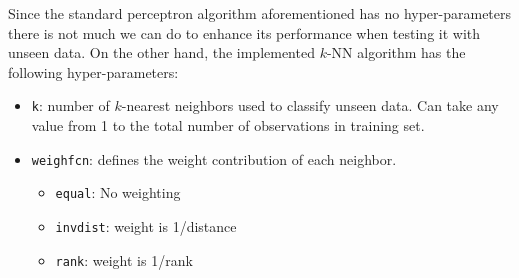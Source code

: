 Since the standard perceptron algorithm aforementioned has no hyper-parameters there is not much we can do to enhance its performance when testing it with unseen data. On the other hand, the implemented $k$-NN algorithm has the following hyper-parameters:
\begin{itemize}
	\item \texttt{k}: number of $k$-nearest neighbors used to classify unseen data. Can take any value from 1 to the total number of observations in training set.
	\item \texttt{weighfcn}: defines the weight contribution of each neighbor.
	\begin{itemize}
		\item \texttt{equal}: No weighting
		\item \texttt{invdist}: weight is 1/distance
		\item \texttt{rank}: weight is 1/rank
	\end{itemize}
\end{itemize}

